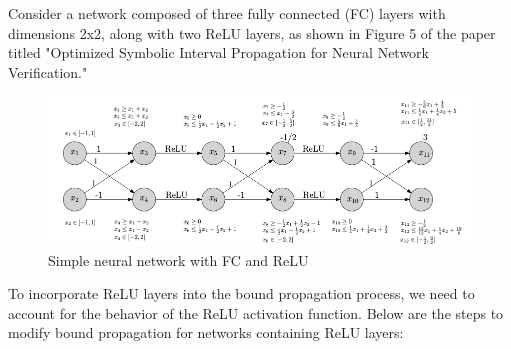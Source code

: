 Consider a network composed of three fully connected (FC) layers with dimensions 2x2, along with two ReLU layers, as shown in Figure 5 of the paper titled "Optimized Symbolic Interval Propagation for Neural Network Verification."


\begin{figure}[t]
	\caption{\label{fig:fc_relu_network} Simple neural network with FC and ReLU}
	\centering
	\includegraphics[scale=0.6]{"Chapter5/img/network_with_bound_prop/network_with_bound_prop.png"}
\end{figure}


To incorporate ReLU layers into the bound propagation process, we need to account for the behavior of the ReLU activation function. Below are the steps to modify bound propagation for networks containing ReLU layers:

